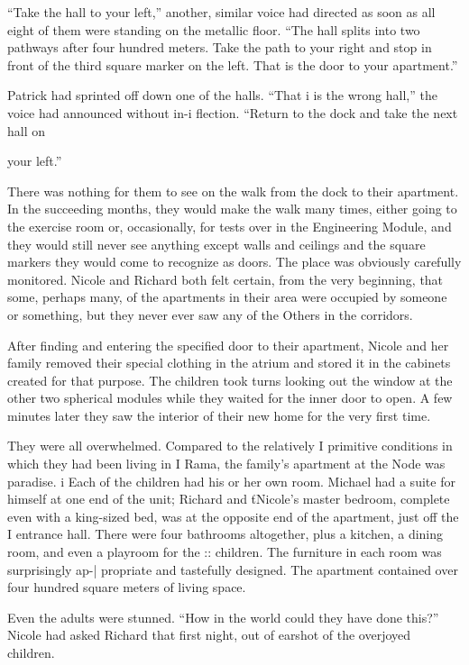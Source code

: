 \documentclass[]{article}
\begin{document}
{“Take the hall to your left,” another, similar voice had directed as soon as all eight of them were standing on the metallic floor.  “The hall splits into two pathways after four hundred meters.  Take the path to your right and stop in front of the third square marker on the left.  That is the door to your apartment.”

Patrick had sprinted off down one of the halls.  “That i is the wrong hall,” the voice had announced without in-i flection.  “Return to the dock and take the next hall on

your left.”

There was nothing for them to see on the walk from the dock to their apartment.  In the succeeding months, they would make the walk many times, either going to the exercise room or, occasionally, for tests over in the Engineering Module, and they would still never see anything except walls and ceilings and the square markers they would come to recognize as doors.  The place was obviously carefully monitored.  Nicole and Richard both felt certain, from the very beginning, that some, perhaps many, of the apartments in their area were occupied by someone or something, but they never ever saw any of the Others in the corridors.

After finding and entering the specified door to their apartment, Nicole and her family removed their special clothing in the atrium and stored it in the cabinets created for that purpose.  The children took turns looking out the window at the other two spherical modules while they waited for the inner door to open.  A few minutes later they saw the interior of their new home for the very first time.

They were all overwhelmed.  Compared to the relatively I primitive conditions in which they had been living in I Rama, the family’s apartment at the Node was paradise.  i Each of the children had his or her own room.  Michael had a suite for himself at one end of the unit; Richard and ťNicole’s master bedroom, complete even with a king-sized bed, was at the opposite end of the apartment, just off the I entrance hall.  There were four bathrooms altogether, plus a kitchen, a dining room, and even a playroom for the :: children.  The furniture in each room was surprisingly ap-| propriate and tastefully designed.  The apartment contained over four hundred square meters of living space.

Even the adults were stunned.  “How in the world could they have done this?” Nicole had asked Richard that first night, out of earshot of the overjoyed children.

}
\end{document}
